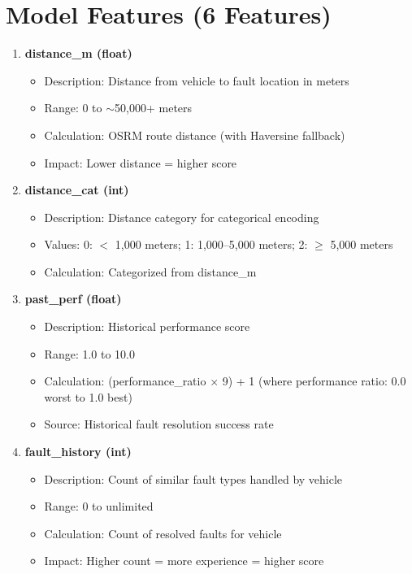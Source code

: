 \section{Model Features (6 Features)}

\begin{enumerate}
    \item \textbf{distance\_m (float)}
    \begin{itemize}
        \item Description: Distance from vehicle to fault location in meters
        \item Range: 0 to $\sim$50,000+ meters
        \item Calculation: OSRM route distance (with Haversine fallback)
        \item Impact: Lower distance = higher score
    \end{itemize}
    
    \item \textbf{distance\_cat (int)}
    \begin{itemize}
        \item Description: Distance category for categorical encoding
        \item Values: 0: $<$ 1,000 meters; 1: 1,000–5,000 meters; 2: $\geq$ 5,000 meters
        \item Calculation: Categorized from distance\_m
    \end{itemize}
    
    \item \textbf{past\_perf (float)}
    \begin{itemize}
        \item Description: Historical performance score
        \item Range: 1.0 to 10.0
        \item Calculation: (performance\_ratio $\times$ 9) + 1 (where performance ratio: 0.0 worst to 1.0 best)
        \item Source: Historical fault resolution success rate
    \end{itemize}
    
    \item \textbf{fault\_history (int)}
    \begin{itemize}
        \item Description: Count of similar fault types handled by vehicle
        \item Range: 0 to unlimited
        \item Calculation: Count of resolved faults for vehicle
        \item Impact: Higher count = more experience = higher score
    \end{itemize}
    

\end{enumerate}
